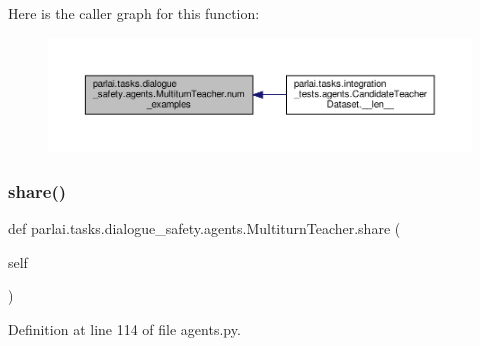 Here is the caller graph for this function\+:
\nopagebreak
\begin{figure}[H]
\begin{center}
\leavevmode
\includegraphics[width=350pt]{classparlai_1_1tasks_1_1dialogue__safety_1_1agents_1_1MultiturnTeacher_ac6e4dcbf81c1576d9415ed579a68a4f7_icgraph}
\end{center}
\end{figure}
\mbox{\label{classparlai_1_1tasks_1_1dialogue__safety_1_1agents_1_1MultiturnTeacher_a87ea872108b71104aaffb2430bfae3df}} 
\subsubsection{\texorpdfstring{share()}{share()}}
{\footnotesize\ttfamily def parlai.\+tasks.\+dialogue\+\_\+safety.\+agents.\+Multiturn\+Teacher.\+share (\begin{DoxyParamCaption}\item[{}]{self }\end{DoxyParamCaption})}



Definition at line 114 of file agents.\+py.



